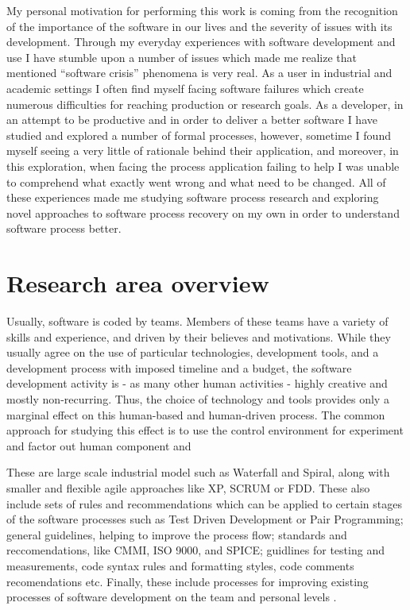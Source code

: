 My personal motivation for performing this work is coming from the recognition of the 
importance of the software in our lives and the severity of issues with its development. 
Through my everyday experiences with software development and use I have stumble upon 
a number of issues which made me realize that mentioned ``software crisis'' phenomena is very real.
As a user in industrial and academic settings I often find myself facing software failures 
which create numerous difficulties for reaching production or research goals. As a developer, 
in an attempt to be productive and in order to deliver a better software I have studied and 
explored a number of formal processes, however, sometime I found myself seeing a very little of 
rationale behind their application, and moreover, in this exploration, when facing the process
application failing to help I was unable to comprehend what exactly went wrong and what need 
to be changed. All of these experiences made me studying software process research and exploring
novel approaches to software process recovery on my own in order to understand software process better.

\section{Research area overview}
Usually, software is coded by teams. Members of these teams have a variety of skills and experience, and
driven by their believes and motivations. While they usually agree on the use of particular technologies, 
development tools, and a development process with imposed timeline and a budget, the software development
activity is - as many other human activities - highly creative and mostly non-recurring. 
Thus, the choice of technology and tools provides only a marginal effect on this human-based and 
human-driven process. The common approach for studying this effect is to use the control environment 
for experiment and factor out human component and 

These are large scale industrial model such as Waterfall and Spiral, along with 
smaller and flexible agile approaches like XP, SCRUM or FDD. These also include sets of 
rules and recommendations which can be applied to certain stages of the software processes 
such as Test Driven Development or Pair Programming; general guidelines, helping 
to improve the process flow; standards and reccomendations, like CMMI, ISO 9000, and SPICE; 
guidlines for testing and measurements, code syntax rules and formatting styles, code comments 
recomendations \cite{citeulike:900855} etc. Finally, these include processes for 
improving existing processes of software development on the team \cite{citeulike:9962027} 
and personal levels \cite{citeulike:9962022}.

